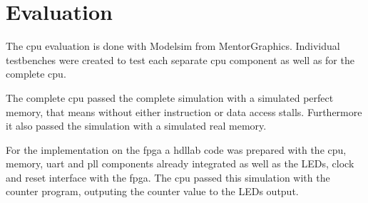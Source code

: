 \chapter{Evaluation}
The cpu evaluation is done with Modelsim from MentorGraphics. Individual testbenches were created to test each separate cpu component as well as for the complete cpu.

The complete cpu passed the complete simulation with a simulated perfect memory, that means without either instruction or data access stalls. Furthermore it also passed 
the simulation with a simulated real memory.

For the implementation on the fpga a hdllab code was prepared with the cpu, memory, uart and pll components already integrated as well as the LEDs, clock and reset interface
with the fpga. The cpu passed this simulation with the counter program, outputing the counter value to the LEDs output.